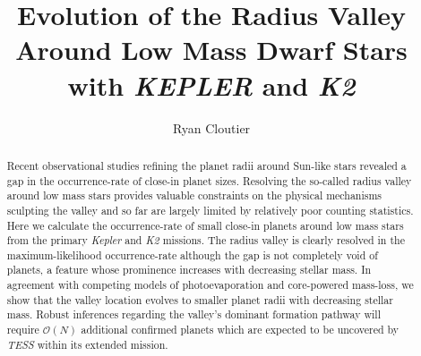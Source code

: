 \documentclass[modern]{aastex63}
\newcommand\kepler{\emph{Kepler}}
\newcommand\ktwo{\emph{K2}}
\newcommand\tess{\emph{TESS}}
\begin{document}
\title{Evolution of the Radius Valley Around Low Mass Dwarf Stars with \emph{KEPLER} and \ktwo{}}

\author[0000-0001-5383-9393]{Ryan Cloutier}

\begin{abstract}  %
  Recent observational studies refining the planet radii around Sun-like stars revealed a gap
  in the occurrence-rate of close-in planet sizes. Resolving the so-called radius valley around low
  mass stars provides valuable constraints on the physical mechanisms sculpting the valley and so far
  are largely limited by relatively poor counting statistics. Here we calculate the occurrence-rate
  of small close-in planets around low mass stars from the primary \kepler{} and \ktwo{} missions.
  The radius
  valley is clearly resolved in the maximum-likelihood occurrence-rate although the gap is not
  completely void of planets, a feature whose prominence increases with decreasing stellar mass. In
  agreement with competing models of photoevaporation and core-powered mass-loss, we show that the
  valley location evolves to smaller planet radii with decreasing stellar mass. Robust inferences
  regarding the valley's dominant formation pathway will require $\mathcal{O}{(N)}$ additional
  confirmed planets which are expected to be uncovered by \tess{} within its extended mission.
\end{abstract}
\end{document}
